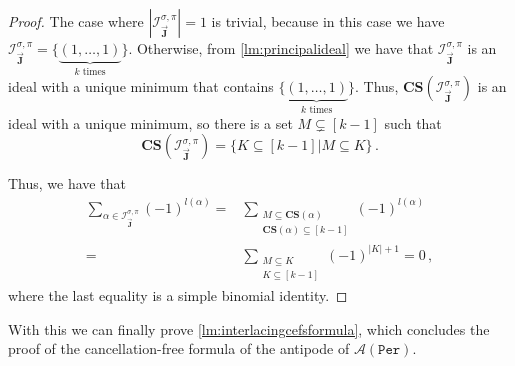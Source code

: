 \documentclass[12pt, reqno]{amsart}
\theoremstyle{definition}
\newcommand{\JJJ}{\vec{\mathbf{J}}}
\begin{document}
\begin{proof}
The case where $|\mathcal I^{\sigma, \pi }_{\JJJ} | = 1$ is trivial, because in this case we have $\mathcal I^{\sigma, \pi }_{\JJJ} = \{\underbrace{(1, \dots ,1 )}_{k \text{ times}}\}$.
Otherwise, from \cref{lm:principalideal} we have that $\mathcal I^{\sigma, \pi }_{\JJJ} $ is an ideal with a unique minimum that contains $\{\underbrace{(1, \dots ,1 )}_{k \text{ times}}\}$.
Thus, $\mathbf{CS} ( \mathcal I^{\sigma, \pi }_{\JJJ}  ) $ is an ideal with a unique minimum, so there is a set $M \subsetneq [k-1] $ such that 
$$\mathbf{CS} ( \mathcal I^{\sigma, \pi }_{\JJJ}  ) = \{K \subseteq [k-1] |  M \subseteq K \} \, . $$

Thus, we have that
\begin{equation}
\begin{split}
\sum_{\alpha \in \mathcal I^{\sigma, \pi }_{\JJJ}}(-1)^{ l(\alpha )} =& \sum_{\substack{M\subseteq \mathbf{CS} (\alpha )\\ \mathbf{CS} (\alpha ) \subseteq [k-1]}} (-1)^{l(\alpha )}\\
=& \sum_{\substack{M\subseteq K\\K \subseteq [k-1]}} (-1)^{|K |+1} = 0\, , 
\end{split}
\end{equation}
where the last equality is a simple binomial identity.
\end{proof}

With this we can finally prove \cref{lm:interlacingcefsformula}, which concludes the proof of the cancellation-free formula of the antipode of $\mathcal A (\mathtt{Per})$.
\end{document}
